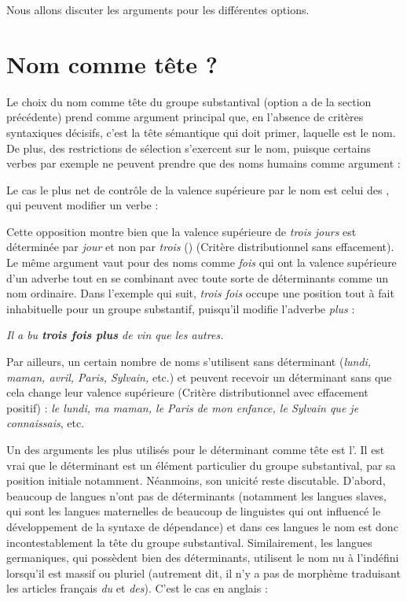 Nous allons discuter les arguments pour les différentes options.

\section{Nom comme tête ?}\label{sec:3.3.24}

Le choix du nom comme tête du groupe substantival (option a de la section précédente) prend comme argument principal que, en l’absence de critères syntaxiques décisifs, c’est la tête sémantique qui doit primer, laquelle est le nom. De plus, des restrictions de sélection s’exercent sur le nom, puisque certains verbes par exemple ne peuvent prendre que des noms humains comme argument :

\ea{}
\z
\z
Le cas le plus net de contrôle de la valence supérieure par le nom est celui des , qui peuvent modifier un verbe :

\ea
  \z
\z
Cette opposition montre bien que la valence supérieure de \textit{trois jours} est déterminée par \textit{jour} et non par \textit{trois} (\citealt{langendonck1994determiners}) (Critère distributionnel sans effacement). Le même argument vaut pour des noms comme \textit{fois} qui ont la valence supérieure d’un adverbe tout en se combinant avec toute sorte de déterminants comme un nom ordinaire. Dans l'exemple qui suit, \textit{trois fois} occupe une position tout à fait inhabituelle pour un groupe substantif, puisqu'il modifie l'adverbe \textit{plus} :

\ea
    \textit{{Il a bu} \textbf{{trois fois plus}} {de vin que les autres}.}
\z

Par ailleurs, un certain nombre de noms s’utilisent sans déterminant (\textit{lundi, maman, avril, Paris, Sylvain,} etc.) et peuvent recevoir un déterminant sans que cela change leur valence supérieure (Critère distributionnel avec effacement positif) : \textit{le lundi, ma maman, le Paris de mon enfance, le Sylvain que je connaissais}, etc.

Un des arguments les plus utilisés pour le déterminant comme tête est l’. Il est vrai que le déterminant est un élément particulier du groupe substantival, par sa position initiale notamment. Néanmoins, son unicité reste discutable. D’abord, beaucoup de langues n’ont pas de déterminants (notamment les langues slaves, qui sont les langues maternelles de beaucoup de linguistes qui ont influencé le développement de la syntaxe de dépendance) et dans ces langues le nom est donc incontestablement la tête du groupe substantival. Similairement, les langues germaniques, qui possèdent bien des déterminants, utilisent le nom nu à l’indéfini lorsqu’il est massif ou pluriel (autrement dit, il n’y a pas de morphème traduisant les articles français \textit{du} et \textit{des}). C'est le cas en anglais :

